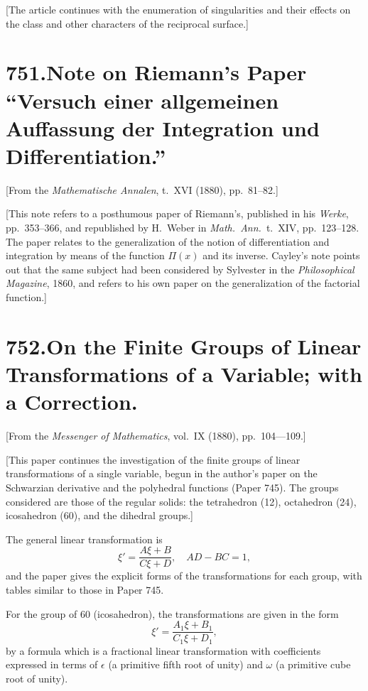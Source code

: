 \documentclass[12pt,a4paper]{article}
\begin{document}
[The article continues with the enumeration of singularities and their effects on the class and other characters of the reciprocal surface.]


\newpage
\section*{\textbf{751.}\quad Note on Riemann's Paper ``Versuch einer allgemeinen Auffassung der Integration und Differentiation.''}

[From the \textit{Mathematische Annalen}, t.~XVI (1880), pp.~81--82.]

\medskip

[This note refers to a posthumous paper of Riemann's, published in his \textit{Werke}, pp.~353--366, and republished by H.~Weber in \textit{Math.\ Ann.}\ t.~XIV, pp.~123--128. The paper relates to the generalization of the notion of differentiation and integration by means of the function $\Pi(x)$ and its inverse. Cayley's note points out that the same subject had been considered by Sylvester in the \textit{Philosophical Magazine}, 1860, and refers to his own paper on the generalization of the factorial function.]


\newpage
\section*{\textbf{752.}\quad On the Finite Groups of Linear Transformations of a Variable; with a Correction.}

[From the \textit{Messenger of Mathematics}, vol.~IX (1880), pp.~104---109.]

\medskip

[This paper continues the investigation of the finite groups of linear transformations of a single variable, begun in the author's paper on the Schwarzian derivative and the polyhedral functions (Paper 745). The groups considered are those of the regular solids: the tetrahedron (12), octahedron (24), icosahedron (60), and the dihedral groups.]

The general linear transformation is
\[
\xi' = \frac{A\xi + B}{C\xi + D},\quad AD - BC = 1,
\]
and the paper gives the explicit forms of the transformations for each group, with tables similar to those in Paper 745.

For the group of 60 (icosahedron), the transformations are given in the form
\[
\xi' = \frac{A_1\xi + B_1}{C_1\xi + D_1},
\]
by a formula which is a fractional linear transformation with coefficients expressed in terms of $\epsilon$ (a primitive fifth root of unity) and $\omega$ (a primitive cube root of unity).
\end{document}
